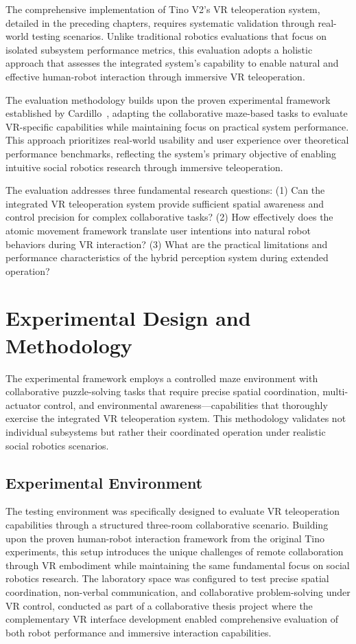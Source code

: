 \label{ch:evaluation}

The comprehensive implementation of Tino V2's VR teleoperation system, detailed in the preceding chapters, requires systematic validation through real-world testing scenarios. Unlike traditional robotics evaluations that focus on isolated subsystem performance metrics, this evaluation adopts a holistic approach that assesses the integrated system's capability to enable natural and effective human-robot interaction through immersive VR teleoperation.

The evaluation methodology builds upon the proven experimental framework established by Cardillo~\cite{cardillo2024thesis}, adapting the collaborative maze-based tasks to evaluate VR-specific capabilities while maintaining focus on practical system performance. This approach prioritizes real-world usability and user experience over theoretical performance benchmarks, reflecting the system's primary objective of enabling intuitive social robotics research through immersive teleoperation.

The evaluation addresses three fundamental research questions: (1) Can the integrated VR teleoperation system provide sufficient spatial awareness and control precision for complex collaborative tasks? (2) How effectively does the atomic movement framework translate user intentions into natural robot behaviors during VR interaction? (3) What are the practical limitations and performance characteristics of the hybrid perception system during extended operation?

\section{Experimental Design and Methodology}
\label{sec:experimental_design}

The experimental framework employs a controlled maze environment with collaborative puzzle-solving tasks that require precise spatial coordination, multi-actuator control, and environmental awareness—capabilities that thoroughly exercise the integrated VR teleoperation system. This methodology validates not individual subsystems but rather their coordinated operation under realistic social robotics scenarios.

\subsection{Experimental Environment}

The testing environment was specifically designed to evaluate VR teleoperation capabilities through a structured three-room collaborative scenario. Building upon the proven human-robot interaction framework from the original Tino experiments, this setup introduces the unique challenges of remote collaboration through VR embodiment while maintaining the same fundamental focus on social robotics research. The laboratory space was configured to test precise spatial coordination, non-verbal communication, and collaborative problem-solving under VR control, conducted as part of a collaborative thesis project where the complementary VR interface development enabled comprehensive evaluation of both robot performance and immersive interaction capabilities.

